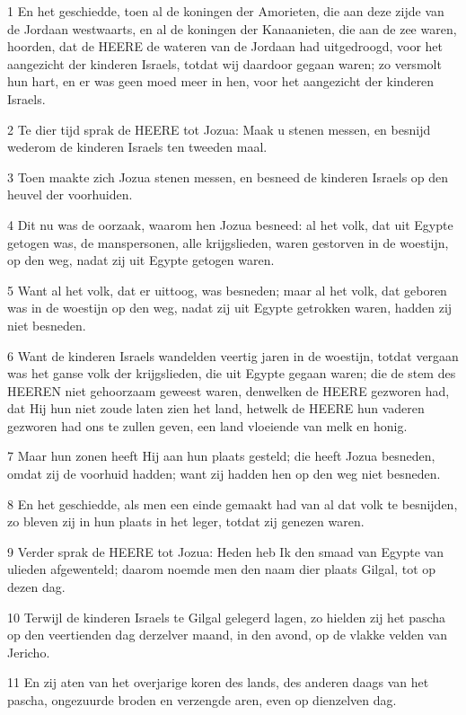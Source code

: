 \par 1 En het geschiedde, toen al de koningen der Amorieten, die aan deze zijde van de Jordaan westwaarts, en al de koningen der Kanaanieten, die aan de zee waren, hoorden, dat de HEERE de wateren van de Jordaan had uitgedroogd, voor het aangezicht der kinderen Israels, totdat wij daardoor gegaan waren; zo versmolt hun hart, en er was geen moed meer in hen, voor het aangezicht der kinderen Israels.
\par 2 Te dier tijd sprak de HEERE tot Jozua: Maak u stenen messen, en besnijd wederom de kinderen Israels ten tweeden maal.
\par 3 Toen maakte zich Jozua stenen messen, en besneed de kinderen Israels op den heuvel der voorhuiden.
\par 4 Dit nu was de oorzaak, waarom hen Jozua besneed: al het volk, dat uit Egypte getogen was, de manspersonen, alle krijgslieden, waren gestorven in de woestijn, op den weg, nadat zij uit Egypte getogen waren.
\par 5 Want al het volk, dat er uittoog, was besneden; maar al het volk, dat geboren was in de woestijn op den weg, nadat zij uit Egypte getrokken waren, hadden zij niet besneden.
\par 6 Want de kinderen Israels wandelden veertig jaren in de woestijn, totdat vergaan was het ganse volk der krijgslieden, die uit Egypte gegaan waren; die de stem des HEEREN niet gehoorzaam geweest waren, denwelken de HEERE gezworen had, dat Hij hun niet zoude laten zien het land, hetwelk de HEERE hun vaderen gezworen had ons te zullen geven, een land vloeiende van melk en honig.
\par 7 Maar hun zonen heeft Hij aan hun plaats gesteld; die heeft Jozua besneden, omdat zij de voorhuid hadden; want zij hadden hen op den weg niet besneden.
\par 8 En het geschiedde, als men een einde gemaakt had van al dat volk te besnijden, zo bleven zij in hun plaats in het leger, totdat zij genezen waren.
\par 9 Verder sprak de HEERE tot Jozua: Heden heb Ik den smaad van Egypte van ulieden afgewenteld; daarom noemde men den naam dier plaats Gilgal, tot op dezen dag.
\par 10 Terwijl de kinderen Israels te Gilgal gelegerd lagen, zo hielden zij het pascha op den veertienden dag derzelver maand, in den avond, op de vlakke velden van Jericho.
\par 11 En zij aten van het overjarige koren des lands, des anderen daags van het pascha, ongezuurde broden en verzengde aren, even op dienzelven dag.
